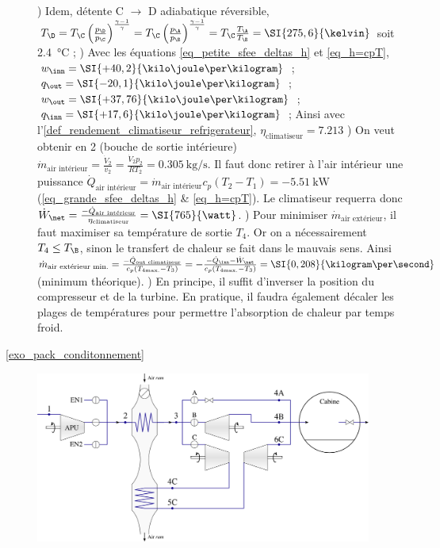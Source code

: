 \begin{description}
				) Idem, détente C $\to$ D adiabatique réversible, $T_\D = T_\C \left(\frac{p_\D}{p_\C}\right)^{\frac{\gamma - 1}{\gamma}} = T_\C \left(\frac{p_\A}{p_\B}\right)^{\frac{\gamma - 1}{\gamma}} = T_\C \frac{T_\A}{T_\B} = \SI{275,6}{\kelvin}$ soit \SI{2,4}{\degreeCelsius} ;
				) Avec les équations \ref{eq_petite_sfee_deltas_h} et \ref{eq_h=cpT}, $w_\inn = \SI{+40,2}{\kilo\joule\per\kilogram}$ ;
						$q_\out = \SI{-20,1}{\kilo\joule\per\kilogram}$ ;
						$w_\out = \SI{+37,76}{\kilo\joule\per\kilogram}$ ;
						$q_\inn = \SI{+17,6}{\kilo\joule\per\kilogram}$ ;
						Ainsi avec l’\cref{def_rendement_climatiseur_refrigerateur}, $\eta_\text{climatiseur} = \num{7,213}$
				) On veut obtenir en 2 (bouche de sortie intérieure) $\dot m_\text{air intérieur} = \frac{\dot V_2}{v_2} = \frac{\dot V_2 p_2}{R T_2} = \SI{0,305}{\kilogram\per\second}$.
						Il faut donc retirer à l’air intérieur une puissance $\dot Q_\text{air intérieur} = \dot m_\text{air intérieur} c_p (T_2 - T_1) = \SI{-5,51}{\kilo\watt}$ (\ref{eq_grande_sfee_deltas_h} \& \ref{eq_h=cpT}).
						Le climatiseur requerra donc $\dot W_\net = \frac{-\dot Q_\text{air intérieur}}{\eta_\text{climatiseur}} = \SI{765}{\watt}$.
				) Pour minimiser $\dot m_\text{air extérieur}$, il faut maximiser sa température de sortie $T_4$. Or on a nécessairement $T_4 \leq T_\B$, sinon le transfert de chaleur se fait dans le mauvais sens. Ainsi $\dot m_\text{air extérieur min.} = \frac{-\dot Q_\text{out climatiseur}}{c_p (T_{4 \text{max.}} - T_3)} = -\frac{-\dot Q_\inn - \dot W_\net}{c_p (T_{4 \text{max.}} - T_3)} = \SI{0,208}{\kilogram\per\second}$ (minimum théorique).
				\tab{}) En principe, il suffit d’inverser la position du compresseur et de la turbine. En pratique, il faudra également décaler les plages de températures pour permettre l’absorption de chaleur par temps froid.
	\item[\ref{exo_pack_conditonnement}]
			\includegraphics[width=0.9\textwidth]{images/exo_sol_circuit_acm.png}\\

\end{description}
